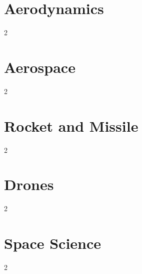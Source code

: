 \documentclass[12pt,a4paper,twoside]{book}
\title{\Huge \booktitle}
\author{Chaman Singh Verma}
\date{}
\begin{document}
\frontmatter
\maketitle
\clearpage

\tableofcontents
\clearpage

\mainmatter

\chapter{Aerodynamics}
\begin{multicols}{2}

\end{multicols}
\clearpage

\chapter{Aerospace}
\begin{multicols}{2}

\end{multicols}
\clearpage

\chapter{Rocket and Missile}
\begin{multicols}{2}

\end{multicols}
\clearpage

\chapter{Drones}
\begin{multicols}{2}

\end{multicols}
\clearpage

\chapter{Space Science}
\begin{multicols}{2}

\end{multicols}
\clearpage

\backmatter
\clearpage
\printglossary[style=altlist,title=Index]
\end{document}

